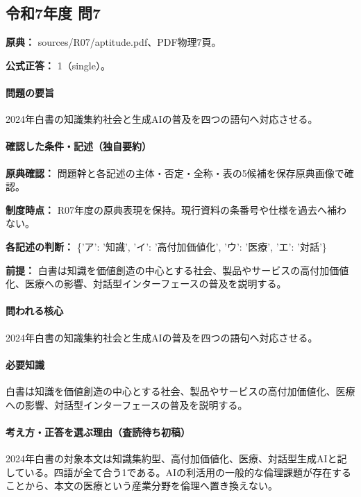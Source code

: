 \subsection{令和7年度 問7}
\label{q:r07-reg-apt-07}

\noindent\textbf{原典：} sources/R07/aptitude.pdf、PDF物理7頁。

\textbf{公式正答：} 1（single）。

\paragraph{問題の要旨} 2024年白書の知識集約社会と生成AIの普及を四つの語句へ対応させる。

\paragraph{確認した条件・記述（独自要約）}\mbox{}\par

\noindent\textbf{原典確認：} 問題幹と各記述の主体・否定・全称・表の5候補を保存原典画像で確認。\par

\noindent\textbf{制度時点：} R07年度の原典表現を保持。現行資料の条番号や仕様を過去へ補わない。\par

\noindent\textbf{各記述の判断：} \{'ア': '知識', 'イ': '高付加価値化', 'ウ': '医療', 'エ': '対話'\}\par

\noindent\textbf{前提：} 白書は知識を価値創造の中心とする社会、製品やサービスの高付加価値化、医療への影響、対話型インターフェースの普及を説明する。\par

\paragraph{問われる核心} 2024年白書の知識集約社会と生成AIの普及を四つの語句へ対応させる。

\paragraph{必要知識} 白書は知識を価値創造の中心とする社会、製品やサービスの高付加価値化、医療への影響、対話型インターフェースの普及を説明する。

\paragraph{考え方・正答を選ぶ理由（査読待ち初稿）} 2024年白書の対象本文は知識集約型、高付加価値化、医療、対話型生成AIと記している。四語が全て合う1である。AIの利活用の一般的な倫理課題が存在することから、本文の医療という産業分野を倫理へ置き換えない。

